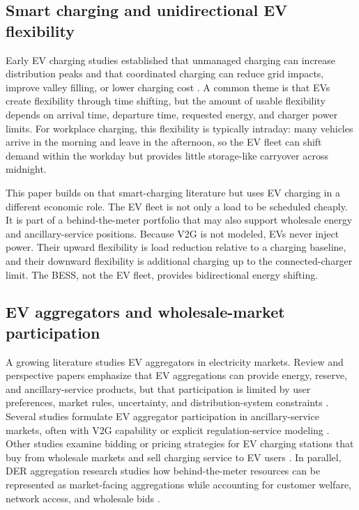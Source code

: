 \documentclass[final,5p,times]{elsarticle}
\begin{document}
\subsection{Smart charging and unidirectional EV flexibility}
Early EV charging studies established that unmanaged charging can increase distribution peaks and that coordinated charging can reduce grid impacts, improve valley filling, or lower charging cost \cite{clement2010impact,sortomme2011optimal,gan2013optimal,richardson2013electric,mwasilu2014electric}. A common theme is that EVs create flexibility through time shifting, but the amount of usable flexibility depends on arrival time, departure time, requested energy, and charger power limits. For workplace charging, this flexibility is typically intraday: many vehicles arrive in the morning and leave in the afternoon, so the EV fleet can shift demand within the workday but provides little storage-like carryover across midnight.

This paper builds on that smart-charging literature but uses EV charging in a different economic role. The EV fleet is not only a load to be scheduled cheaply. It is part of a behind-the-meter portfolio that may also support wholesale energy and ancillary-service positions. Because V2G is not modeled, EVs never inject power. Their upward flexibility is load reduction relative to a charging baseline, and their downward flexibility is additional charging up to the connected-charger limit. The BESS, not the EV fleet, provides bidirectional energy shifting.

\subsection{EV aggregators and wholesale-market participation}
A growing literature studies EV aggregators in electricity markets. Review and perspective papers emphasize that EV aggregations can provide energy, reserve, and ancillary-service products, but that participation is limited by user preferences, market rules, uncertainty, and distribution-system constraints \cite{nazari2022updated,amiri2023participation}. Several studies formulate EV aggregator participation in ancillary-service markets, often with V2G capability or explicit regulation-service modeling \cite{clairand2019participation,delatorre2023optimal}. Other studies examine bidding or pricing strategies for EV charging stations that buy from wholesale markets and sell charging service to EV users \cite{mousavi2022evcsWholesale,bayani2021strategic}. In parallel, DER aggregation research studies how behind-the-meter resources can be represented as market-facing aggregations while accounting for customer welfare, network access, and wholesale bids \cite{chen2023competitiveDER,cui2022gridaware,chen2022dsoDERA}.
\end{document}
